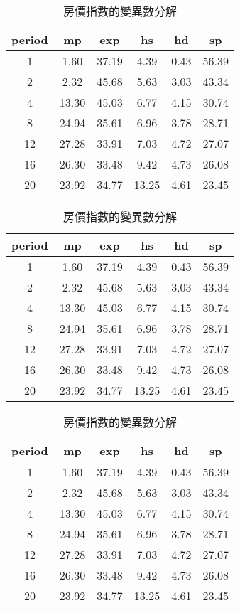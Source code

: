 \begin{table}[h]
\centering
\begin{tabular}{cccccc}
  \hline
period & mp & exp & hs & hd & sp \\ 
  \hline
1 & 1.60 & 37.19 & 4.39 & 0.43 & 56.39 \\ 
   \hline
2 & 2.32 & 45.68 & 5.63 & 3.03 & 43.34 \\ 
   \hline
4 & 13.30 & 45.03 & 6.77 & 4.15 & 30.74 \\ 
   \hline
8 & 24.94 & 35.61 & 6.96 & 3.78 & 28.71 \\ 
   \hline
12 & 27.28 & 33.91 & 7.03 & 4.72 & 27.07 \\ 
   \hline
16 & 26.30 & 33.48 & 9.42 & 4.73 & 26.08 \\ 
   \hline
20 & 23.92 & 34.77 & 13.25 & 4.61 & 23.45 \\ 
   \hline
\end{tabular}
\caption{房價指數的變異數分解} 
\end{table}
\begin{table}[h]
\centering
\begin{tabular}{cccccc}
  \hline
period & mp & exp & hs & hd & sp \\ 
  \hline
1 & 1.60 & 37.19 & 4.39 & 0.43 & 56.39 \\ 
   \hline
2 & 2.32 & 45.68 & 5.63 & 3.03 & 43.34 \\ 
   \hline
4 & 13.30 & 45.03 & 6.77 & 4.15 & 30.74 \\ 
   \hline
8 & 24.94 & 35.61 & 6.96 & 3.78 & 28.71 \\ 
   \hline
12 & 27.28 & 33.91 & 7.03 & 4.72 & 27.07 \\ 
   \hline
16 & 26.30 & 33.48 & 9.42 & 4.73 & 26.08 \\ 
   \hline
20 & 23.92 & 34.77 & 13.25 & 4.61 & 23.45 \\ 
   \hline
\end{tabular}
\caption{房價指數的變異數分解} 
\end{table}
\begin{table}[h]
\centering
\begin{tabular}{cccccc}
  \hline
period & mp & exp & hs & hd & sp \\ 
  \hline
1 & 1.60 & 37.19 & 4.39 & 0.43 & 56.39 \\ 
   \hline
2 & 2.32 & 45.68 & 5.63 & 3.03 & 43.34 \\ 
   \hline
4 & 13.30 & 45.03 & 6.77 & 4.15 & 30.74 \\ 
   \hline
8 & 24.94 & 35.61 & 6.96 & 3.78 & 28.71 \\ 
   \hline
12 & 27.28 & 33.91 & 7.03 & 4.72 & 27.07 \\ 
   \hline
16 & 26.30 & 33.48 & 9.42 & 4.73 & 26.08 \\ 
   \hline
20 & 23.92 & 34.77 & 13.25 & 4.61 & 23.45 \\ 
   \hline
\end{tabular}
\caption{房價指數的變異數分解} 
\end{table}

